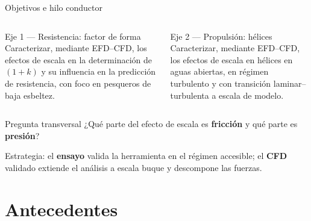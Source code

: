 \documentclass[aspectratio=169,10pt]{beamer}
\newcommand{\uk}{(1+k)}
\begin{document}
\begin{frame}{Objetivos e hilo conductor}
\begin{columns}[T]
\begin{block}{Eje 1 — Resistencia: factor de forma}
\small Caracterizar, mediante EFD–CFD, los efectos de escala en la determinación de $\uk$ y su influencia en la predicción de resistencia, con foco en \alert{pesqueros de baja esbeltez}.
\end{block}
\begin{block}{Eje 2 — Propulsión: hélices}
\small Caracterizar, mediante EFD–CFD, los efectos de escala en hélices en aguas abiertas, en régimen \alert{turbulento} y con \alert{transición} laminar–turbulenta a escala de modelo.
\end{block}
\end{columns}
\vspace{1em}
\begin{alertblock}{Pregunta transversal}
¿Qué parte del efecto de escala es \textbf{fricción} y qué parte es \textbf{presión}?
\end{alertblock}
\vspace{0.4em}
\small Estrategia: el \textbf{ensayo} valida la herramienta en el régimen accesible; el \textbf{CFD} validado extiende el análisis a escala buque y \alert{descompone las fuerzas}.
\end{frame}

\section{Antecedentes}
\end{document}
